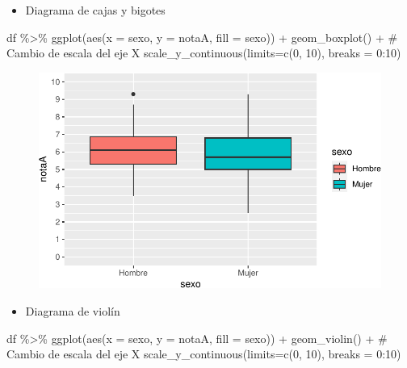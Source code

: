 \documentclass[
  a4paper,
]{scrreport}
\newenvironment{Shaded}{\begin{snugshade}}{\end{snugshade}}
\newcommand{\AttributeTok}[1]{\textcolor[rgb]{0.40,0.45,0.13}{#1}}
\newcommand{\CommentTok}[1]{\textcolor[rgb]{0.37,0.37,0.37}{#1}}
\newcommand{\DecValTok}[1]{\textcolor[rgb]{0.68,0.00,0.00}{#1}}
\newcommand{\FunctionTok}[1]{\textcolor[rgb]{0.28,0.35,0.67}{#1}}
\newcommand{\NormalTok}[1]{\textcolor[rgb]{0.00,0.23,0.31}{#1}}
\newcommand{\SpecialCharTok}[1]{\textcolor[rgb]{0.37,0.37,0.37}{#1}}
\providecommand{\tightlist}{%
  \setlength{\itemsep}{0pt}\setlength{\parskip}{0pt}}\usepackage{longtable,booktabs,array}
\theoremstyle{definition}
\theoremstyle{definition}
\theoremstyle{remark}
\begin{document}
\begin{itemize}
\tightlist
\item
  Diagrama de cajas y bigotes
\end{itemize}

\begin{Shaded}
\begin{Highlighting}[]
\NormalTok{df }\SpecialCharTok{\%\textgreater{}\%} \FunctionTok{ggplot}\NormalTok{(}\FunctionTok{aes}\NormalTok{(}\AttributeTok{x =}\NormalTok{ sexo, }\AttributeTok{y =}\NormalTok{ notaA, }\AttributeTok{fill =}\NormalTok{ sexo)) }\SpecialCharTok{+} 
  \FunctionTok{geom\_boxplot}\NormalTok{() }\SpecialCharTok{+}
  \CommentTok{\# Cambio de escala del eje X}
  \FunctionTok{scale\_y\_continuous}\NormalTok{(}\AttributeTok{limits=}\FunctionTok{c}\NormalTok{(}\DecValTok{0}\NormalTok{, }\DecValTok{10}\NormalTok{), }\AttributeTok{breaks =} \DecValTok{0}\SpecialCharTok{:}\DecValTok{10}\NormalTok{)}
\end{Highlighting}
\end{Shaded}

\begin{figure}[H]

{\centering \includegraphics{./08-analisis-estadisticos_files/figure-pdf/unnamed-chunk-28-1.pdf}

}

\end{figure}

\begin{itemize}
\tightlist
\item
  Diagrama de violín
\end{itemize}

\begin{Shaded}
\begin{Highlighting}[]
\NormalTok{df }\SpecialCharTok{\%\textgreater{}\%} \FunctionTok{ggplot}\NormalTok{(}\FunctionTok{aes}\NormalTok{(}\AttributeTok{x =}\NormalTok{ sexo, }\AttributeTok{y =}\NormalTok{ notaA, }\AttributeTok{fill =}\NormalTok{ sexo)) }\SpecialCharTok{+} 
  \FunctionTok{geom\_violin}\NormalTok{() }\SpecialCharTok{+}
  \CommentTok{\# Cambio de escala del eje X}
  \FunctionTok{scale\_y\_continuous}\NormalTok{(}\AttributeTok{limits=}\FunctionTok{c}\NormalTok{(}\DecValTok{0}\NormalTok{, }\DecValTok{10}\NormalTok{), }\AttributeTok{breaks =} \DecValTok{0}\SpecialCharTok{:}\DecValTok{10}\NormalTok{)}
\end{Highlighting}
\end{Shaded}
\end{document}
